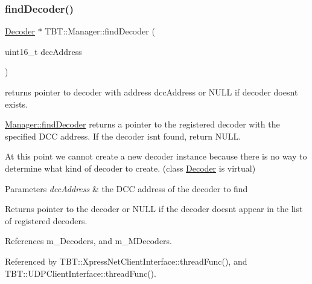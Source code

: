 \mbox{\label{classTBT_1_1Manager_a04d5ae5069f1f17ee682f4ae68141687_a04d5ae5069f1f17ee682f4ae68141687}} 
\subsubsection{\texorpdfstring{find\+Decoder()}{findDecoder()}}
{\footnotesize\ttfamily \hyperlink{classTBT_1_1Decoder}{Decoder} $\ast$ T\+B\+T\+::\+Manager\+::find\+Decoder (\begin{DoxyParamCaption}\item[{uint16\+\_\+t}]{dcc\+Address }\end{DoxyParamCaption})}



returns pointer to decoder with address dcc\+Address or N\+U\+LL if decoder doesn\textquotesingle{}t exists. 

\hyperlink{classTBT_1_1Manager_a04d5ae5069f1f17ee682f4ae68141687_a04d5ae5069f1f17ee682f4ae68141687}{Manager\+::find\+Decoder} returns a pointer to the registered decoder with the specified D\+CC address. If the decoder isn\textquotesingle{}t found, return N\+U\+LL.

At this point we cannot create a new decoder instance because there is no way to determine what kind of decoder to create. (class \hyperlink{classTBT_1_1Decoder}{Decoder} is virtual)


\begin{DoxyParams}{Parameters}
{\em dcc\+Address} & the D\+CC address of the decoder to find\\
\hline
\end{DoxyParams}
\begin{DoxyReturn}{Returns}
pointer to the decoder or N\+U\+LL if the decoder doesn\textquotesingle{}t appear in the list of registered decoders. 
\end{DoxyReturn}


References m\+\_\+\+Decoders, and m\+\_\+\+M\+Decoders.



Referenced by T\+B\+T\+::\+Xpress\+Net\+Client\+Interface\+::thread\+Func(), and T\+B\+T\+::\+U\+D\+P\+Client\+Interface\+::thread\+Func().

\mbox{\label{classTBT_1_1Manager_a78e5bea49f6662b5f44c1c0aafe4cb75_a78e5bea49f6662b5f44c1c0aafe4cb75}} 
